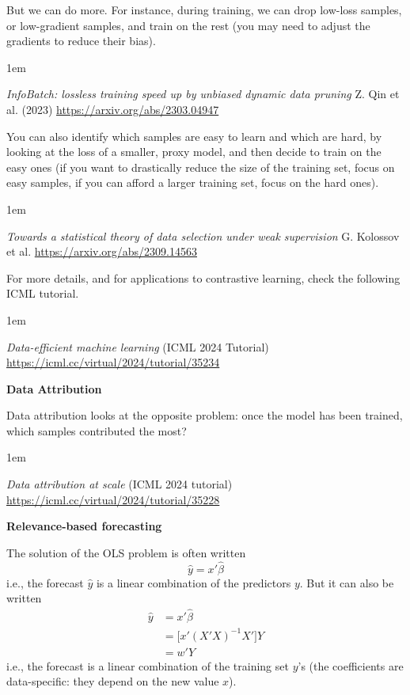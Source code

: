 \documentclass[a5paper]{article}
\newenvironment{reference}{%
  \medskip\goodbreak
  \parskip 0pt
  \raggedright
  \leftskip 1em
  \obeylines
}{\par\medskip\goodbreak}
\def\subsection#1{{\par\bigskip\goodbreak\large\bfseries #1\par}}
\begin{document}
But we can do more.
For instance, during training, we can drop low-loss samples,
or low-gradient samples, and train on the rest
(you may need to adjust the gradients to reduce their bias).

\begin{reference}
  \emph{InfoBatch: lossless training speed up by unbiased dynamic data pruning}
  Z. Qin et al. (2023)
  \url{https://arxiv.org/abs/2303.04947}
\end{reference}

You can also identify which samples are easy to learn and which are hard,
by looking at the loss of a smaller, proxy model,
and then decide to train on the easy ones (if you want to drastically reduce
the size of the training set, focus on easy samples,
if you can afford a larger training set, focus on the hard ones).

\begin{reference}
  \emph{Towards a statistical theory of data selection under weak supervision}
  G. Kolossov et al.
  \url{https://arxiv.org/abs/2309.14563}
\end{reference}

For more details, and for applications to contrastive learning, check the following ICML tutorial.

\begin{reference}
  \emph{Data-efficient machine learning}
  (ICML 2024 Tutorial)
  \url{https://icml.cc/virtual/2024/tutorial/35234}
\end{reference}

\subsection{Data Attribution}

Data attribution looks at the opposite problem:
once the model has been trained, which samples contributed the most?

\begin{reference}
  \emph{Data attribution at scale}
  (ICML 2024 tutorial)
  \url{https://icml.cc/virtual/2024/tutorial/35228}
\end{reference}

\subsection{Relevance-based forecasting}

The solution of the OLS problem is often written
\[ \hat y = x' \hat \beta \]
i.e., the forecast $\hat y$ is a linear combination of the predictors $y$.
But it can also be written
\begin{align*}
  \hat y &= x' \hat \beta \\
  &= \bigl[  x' (X' X )^{-1} X' \bigr] Y \\
  &= w' Y
\end{align*}
i.e., the forecast is a linear combination of the training set $y$'s
(the coefficients are data-specific: they depend on the new value $x$).
\end{document}

